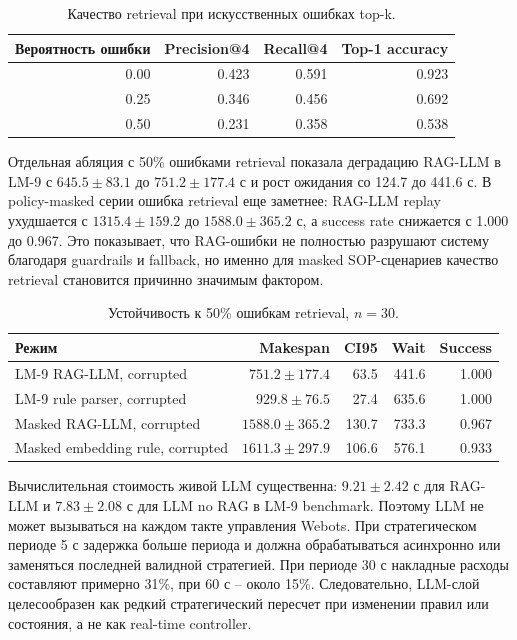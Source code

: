 \documentclass[runningheads]{llncs}
\begin{document}
\begin{table}[!htbp]
\centering
\caption{Качество retrieval при искусственных ошибках top-k.}
\label{tab:retrieval}
\scriptsize
\begin{tabular}{rrrr}
\toprule
Вероятность ошибки & Precision@4 & Recall@4 & Top-1 accuracy \\
\midrule
0.00 & 0.423 & 0.591 & 0.923 \\
0.25 & 0.346 & 0.456 & 0.692 \\
0.50 & 0.231 & 0.358 & 0.538 \\
\bottomrule
\end{tabular}
\end{table}

Отдельная абляция с 50\% ошибками retrieval показала деградацию RAG-LLM в LM-9 с $645.5\pm83.1$ до $751.2\pm177.4$ с и рост ожидания со 124.7 до 441.6 с. В policy-masked серии ошибка retrieval еще заметнее: RAG-LLM replay ухудшается с $1315.4\pm159.2$ до $1588.0\pm365.2$ с, а success rate снижается с 1.000 до 0.967. Это показывает, что RAG-ошибки не полностью разрушают систему благодаря guardrails и fallback, но именно для masked SOP-сценариев качество retrieval становится причинно значимым фактором.

\begin{table}[!htbp]
\centering
\caption{Устойчивость к 50\% ошибкам retrieval, $n=30$.}
\label{tab:retrieval-error}
\scriptsize
\begin{tabular}{lrrrr}
\toprule
Режим & Makespan & CI95 & Wait & Success \\
\midrule
LM-9 RAG-LLM, corrupted & $751.2\pm177.4$ & 63.5 & 441.6 & 1.000 \\
LM-9 rule parser, corrupted & $929.8\pm76.5$ & 27.4 & 635.6 & 1.000 \\
Masked RAG-LLM, corrupted & $1588.0\pm365.2$ & 130.7 & 733.3 & 0.967 \\
Masked embedding rule, corrupted & $1611.3\pm297.9$ & 106.6 & 576.1 & 0.933 \\
\bottomrule
\end{tabular}
\end{table}

Вычислительная стоимость живой LLM существенна: $9.21\pm2.42$ с для RAG-LLM и $7.83\pm2.08$ с для LLM no RAG в LM-9 benchmark. Поэтому LLM не может вызываться на каждом такте управления Webots. При стратегическом периоде 5 с задержка больше периода и должна обрабатываться асинхронно или заменяться последней валидной стратегией. При периоде 30 с накладные расходы составляют примерно 31\%, при 60 с -- около 15\%. Следовательно, LLM-слой целесообразен как редкий стратегический пересчет при изменении правил или состояния, а не как real-time controller.
\end{document}
